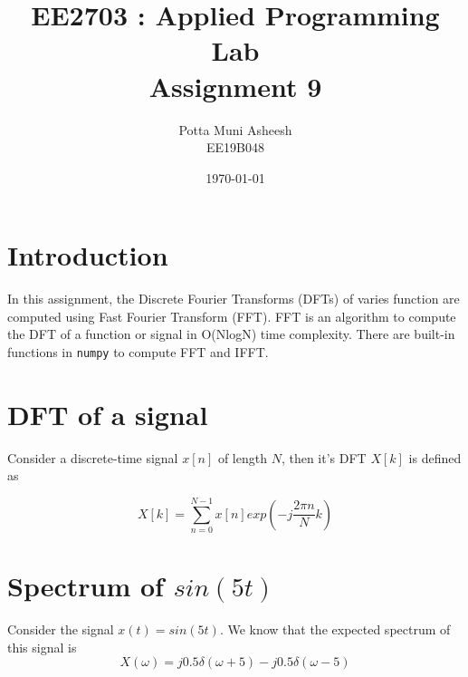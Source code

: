 \documentclass[12pt, a4paper]{article}
\title{\textbf{EE2703 : Applied Programming Lab \\ Assignment 9}} %
\author{Potta Muni Asheesh \\ EE19B048} %
\date{\today} %
\begin{document}
	
		
\maketitle %

\section{Introduction}

In this assignment, the Discrete Fourier Transforms (DFTs) of varies function are computed using Fast Fourier Transform (FFT). FFT is an algorithm to compute the DFT of a function or signal in O(NlogN) time complexity. There are built-in functions in \texttt{numpy} to compute FFT and IFFT.

\section{DFT of a signal}

Consider a discrete-time signal $x[n]$ of length $N$, then it's DFT $X[k]$ is defined as

\begin{equation*}
X[k] = \sum_{n=0}^{N-1}x[n]exp\left(-j\frac{2\pi n}{N} k \right)
\end{equation*}

\section{Spectrum of $sin(5t)$}

Consider the signal $x(t) = sin(5t)$. We know that the expected spectrum of this signal is
\begin{equation*}
X(\omega) = j0.5\delta(\omega+5) - j0.5\delta(\omega-5)
\end{equation*}
\end{document}
